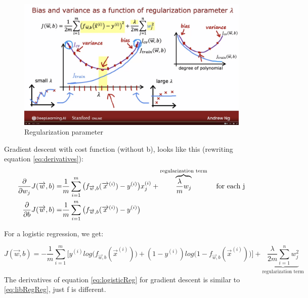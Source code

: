 \documentclass[12pt]{report}
\begin{document}
\begin{figure}[H]
  \centering
  \includegraphics[trim =0.0cm 0.0cm 0.0cm 0.0cm, clip, scale=0.12]{pics/regularization.png}
  \caption{Regularization parameter}
\end{figure}



Gradient descent with cost function (without b), looks like this (rewriting equation \ref{eq:derivatives}):
\begin{equation}
\label{eq:libRegReg}
  \begin{split}
    \frac{\partial}{\partial w_j} J(\overrightarrow{w},b) =&  \frac{1}{m} \sum_{i=1}^{m} \big( f_{\overrightarrow{w},b} (\overrightarrow{x}^{(i)}) - y^{(i)} \big) x_j^{(i)} + \overbrace{\frac{\lambda}{m} w_j}^\text{regularization term} \text{\: \: for each j} \\
    \frac{\partial}{\partial b} J(\overrightarrow{w},b)   =& \frac{1}{m} \sum_{i=1}^{m} \big( f_{\overrightarrow{w},b} (\overrightarrow{x}^{(i)})  - y^{(i)} \big)
  \end{split}
\end{equation}

For a logistic regression, we get:

\begin{equation}
  J(\overrightarrow{w},b)   = -\frac{1}{m} \sum_{i=1}^{m} \big[ y^{(i)} log\big( f_{\overrightarrow{w},b} (\overrightarrow{x}^{(i)}) \big) + (1-y^{(i)}) log\big(1-f_{\overrightarrow{w},b} (\overrightarrow{x}^{(i)}) \big)  \big]+ \underbrace{ \frac{\lambda}{2m} \sum_{i=1}^n w_j^2}_\text{regularization term}
\label{eq:logisticReg}
\end{equation}
The derivatives of equation \ref{eq:logisticReg} for gradient descent is similar to \ref{eq:libRegReg}, just f is different.
\end{document}
